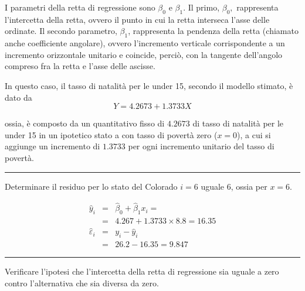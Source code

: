 \documentclass[
  11pt,
]{book}
\theoremstyle{mytheoremstyle}
\theoremstyle{mydefstyle}
\newenvironment{sol}
  {
  \begin{tcolorbox}[enhanced,breakable,arc=0.1mm,boxrule=1pt,colback=white,colframe=iblue,
  title=\bf \fontfamily{lmss}\selectfont \hspace{.5 cm} Soluzione,drop fuzzy shadow]

}{
\end{tcolorbox}
  }
\begin{document}
\begin{sol}
I parametri della retta di regressione sono \(\beta_{0}\) e \(\beta_{1}\).
Il primo, \(\beta_{0},\) rappresenta l'intercetta della retta,
ovvero il punto in cui la retta interseca l'asse delle ordinate.
Il secondo parametro, \(\beta_{1}\), rappresenta la pendenza della
retta (chiamato anche coefficiente angolare), ovvero l'incremento
verticale corrispondente a un incremento orizzontale unitario e
coincide, perciò, con la tangente dell'angolo compreso fra la
retta e l'asse delle ascisse.

In questo caso, il tasso di natalità per le under 15,
secondo il modello stimato, è dato da
\[Y= 4.2673 + 1.3733 X\]

ossia, è composto da un quantitativo fisso di \(4.2673\) di tasso di natalità per le under 15 in un ipotetico stato a con tasso di povertà zero (\(x=0\)), a cui si aggiunge un incremento di \(1.3733\) per ogni incremento unitario del tasso di povertà.

\end{sol}

\begin{center}\rule{0.5\linewidth}{0.5pt}\end{center}

Determinare il residuo per lo stato del Colorado \(i=6\)
uguale 6, ossia per \(x=6\).

\begin{sol}
\begin{eqnarray*}
\hat y_i &=&\hat\beta_0+\hat\beta_1 x_i=\\ 
&=& 4.267 + 1.3733 \times 8.8 = 16.35 \\ 
\hat \varepsilon_i &=& y_i-\hat y_i\\ 
&=& 26.2 - 16.35 = 9.847  
\end{eqnarray*}

\end{sol}

\begin{center}\rule{0.5\linewidth}{0.5pt}\end{center}

Verificare l'ipotesi che l'intercetta della retta di regressione sia uguale a
zero contro l'alternativa che sia diversa da zero.
\end{document}
